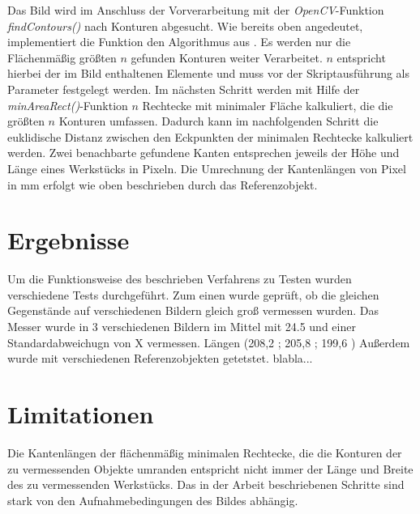 \documentclass[twocolumn,10pt]{asme2ej}
\begin{document}
Das Bild wird im Anschluss der Vorverarbeitung mit der \emph{OpenCV}-Funktion \emph{findContours()} nach Konturen abgesucht. Wie bereits oben angedeutet, implementiert die Funktion den Algorithmus aus \cite{Suzuki1985TopologicalSA}. Es werden nur die Flächenmäßig größten \(n\) gefunden Konturen weiter Verarbeitet. \(n\) entspricht hierbei der im  Bild enthaltenen Elemente und muss vor der Skriptausführung als Parameter festgelegt werden. Im nächsten Schritt werden mit Hilfe der \emph{minAreaRect()}-Funktion \(n\) Rechtecke mit minimaler Fläche kalkuliert, die die größten \(n\) Konturen umfassen. Dadurch kann im nachfolgenden Schritt die euklidische Distanz zwischen den Eckpunkten der minimalen Rechtecke kalkuliert werden. Zwei benachbarte gefundene Kanten entsprechen jeweils der Höhe und Länge eines Werkstücks in Pixeln. Die Umrechnung der Kantenlängen von Pixel in mm erfolgt wie oben beschrieben durch das Referenzobjekt.

\section{Ergebnisse}
Um die Funktionsweise des beschrieben Verfahrens zu Testen wurden verschiedene Tests durchgeführt. Zum einen wurde geprüft, ob die gleichen Gegenstände auf verschiedenen Bildern gleich groß vermessen wurden. Das Messer wurde in 3 verschiedenen Bildern im Mittel mit 24.5 und einer Standardabweichugn von X vermessen. Längen (208,2 ; 205,8 ; 199,6 )
Außerdem wurde mit verschiedenen Referenzobjekten getetstet. blabla...

\section{Limitationen}
Die Kantenlängen der flächenmäßig minimalen Rechtecke, die die Konturen der zu vermessenden Objekte umranden entspricht nicht immer der Länge und Breite des zu vermessenden Werkstücks. Das in der Arbeit beschriebenen Schritte sind stark von den Aufnahmebedingungen des Bildes abhängig.




\end{document}
